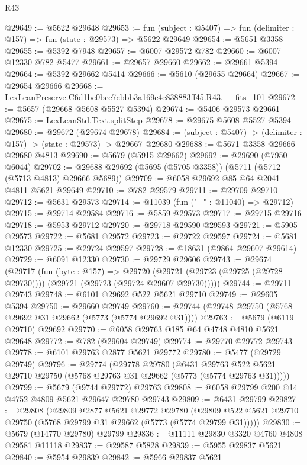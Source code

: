 \begin{lexlean}{R43}
\begin{coremodule}
@29649 := @5622 @29648
@29653 := fun (subject : @5407) => fun (delimiter : @157) => fun (state : @29573) => @5622 @29649
@29654 := @5651 @3358
@29655 := @5392 @7948
@29657 := @6007 @29572 @782
@29660 := @6007 @12330 @782 @5477
@29661 := @29657 @29660
@29662 := @29661 @5394
@29664 := @5392 @29662 @5414
@29666 := @5610 (@29655 @29664)
@29667 := @29654 @29666
@29668 := LexLeanPreserve.C6d1bc0bcc7cbbb3a169c4e838883ff45.R43.__fits_101
@29672 := @5657 (@29668 @5608 @5527 @5394)
@29674 := @5406 @29573 @29661
@29675 := LexLeanStd.Text.splitStep
@29678 := @29675 @5608 @5527 @5394
@29680 := @29672 (@29674 @29678)
@29684 := (subject : @5407) -> (delimiter : @157) -> (state : @29573) -> @29667 @29680
@29688 := @5671 @3358 @29666 @29680 @4813
@29690 := @5679 (@5915 @29662)
@29692 := @29690 (@7950 @6044)
@29702 := @29688 @29692 (@5695 (@5705 @3358)) (@5711 (@5712 (@5713 @4813) @29666 @5689))
@29709 := @6058 @29692 @85 @64 @2041 @4811 @5621 @29649
@29710 := @782 @29579
@29711 := @29709 @29710
@29712 := @5631 @29573
@29714 := @11039 (fun ("_" : @11040) => @29712)
@29715 := @29714 @29584
@29716 := @5859 @29573
@29717 := @29715 @29716
@29718 := @5953 @29712
@29720 := @29718 @29590 @29593
@29721 := @5905 @29573
@29722 := @5681 @29572
@29723 := @29722 @29597
@29724 := @5681 @12330
@29725 := @29724 @29597
@29728 := @18631 (@9864 @29607 @29614)
@29729 := @6091 @12330
@29730 := @29729 @29606
@29743 := @29674
    (@29717
      (fun (byte : @157) =>
      @29720 (@29721 (@29723 (@29725 (@29728 @29730)))) (@29721 (@29723 (@29724 @29607 @29730)))))
@29744 := @29711 @29743
@29748 := @6101 @29692 @522 @5621 @29710
@29749 := @29605 @5394
@29750 := @29660 @29749
@29760 := @29744 (@29748 @29750 (@5768 @29692 @31 @29662 (@5773 (@5774 @29692 @31))))
@29763 := @5679 (@6119 @29710) @29692
@29770 := @6058 @29763 @185 @64 @4748 @4810 @5621 @29648
@29772 := @782 (@29604 @29749)
@29774 := @29770 @29772 @29743
@29778 := @6101 @29763 @2877 @5621 @29772
@29780 := @5477 (@29729 @29749)
@29796 := @29774
    (@29778
      @29780
      (@6431 @29763 @522 @5621 @29710 @29750 (@5768 @29763 @31 @29662 (@5773 (@5774 @29763 @31)))))
@29799 := @5679 (@9744 @29772) @29763
@29808 := @6058 @29799 @200 @14 @4752 @4809 @5621 @29647 @29780 @29743
@29809 := @6431 @29799
@29827 := @29808
    (@29809
      @2877
      @5621
      @29772
      @29780
      (@29809 @522 @5621 @29710 @29750 (@5768 @29799 @31 @29662 (@5773 (@5774 @29799 @31)))))
@29830 := @5679 (@14770 @29780) @29799
@29836 := @11111 @29830 @3320 @4760 @4808 @29581 @11118
@29837 := @29587 @5828
@29839 := @5955 @29837 @5621
@29840 := @5954 @29839
@29842 := @5966 @29837 @5621

\end{coremodule}
\end{lexlean}
